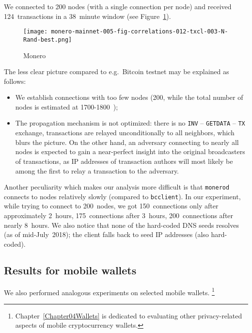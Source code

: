 We connected to 200 nodes (with a single connection per node) and received 124~transactions in a 38~minute window (see Figure~\ref{fig:monero}).

\begin{figure}[!t]
	\centering
	\texttt{[image: monero-mainnet-005-fig-correlations-012-txcl-003-N-Rand-best.png]}
	\caption{Monero}
	\label{fig:monero}
\end{figure}

The less clear picture compared to e.g.~Bitcoin testnet may be explained as follows:
\begin{itemize}
	\item We establish connections with too few nodes (200, while the total number of nodes is estimated at 1700-1800~\cite{MoneroHash});
	\item The propagation mechanism is not optimized: there is no \texttt{INV} -- \texttt{GETDATA} -- \texttt{TX} exchange, transactions are relayed unconditionally to all neighbors, which blurs the picture. On the other hand, an adversary connecting to nearly all nodes is expected to gain a near-perfect insight into the original broadcasters of transactions, as IP addresses of transaction authors will most likely be among the first to relay a transaction to the adversary.
\end{itemize}
Another peculiarity which makes our analysis more difficult is that \texttt{monerod} connects to nodes relatively slowly (compared to \texttt{bcclient}).
In our experiment, while trying to connect to 200~nodes, we got 150~connections only after approximately 2~hours, 175~connections after 3~hours, 200~connections after nearly 8~hours.
We also notice that none of the hard-coded DNS seeds resolves (as of mid-July~2018); the client falls back to seed IP addresses (also hard-coded).


\subsection{Results for mobile wallets}

We also performed analogous experiments on selected mobile wallets.
\footnote{Chapter~\ref{Chapter04Wallets} is dedicated to evaluating other privacy-related aspects of mobile cryptocurrency wallets.}

